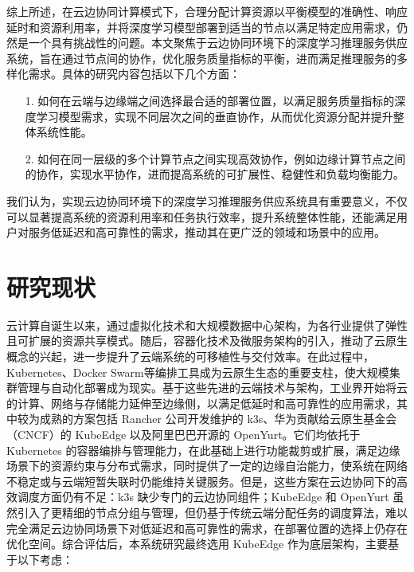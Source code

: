 综上所述，在云边协同计算模式下，合理分配计算资源以平衡模型的准确性、响应延时和资源利用率，并将深度学习模型部署到适当的节点以满足特定应用需求，仍然是一个具有挑战性的问题。本文聚焦于云边协同环境下的深度学习推理服务供应系统，旨在通过节点间的协作，优化服务质量指标的平衡，进而满足推理服务的多样化需求。具体的研究内容包括以下几个方面：

\begin{enumerate}
\item[1.] 如何在云端与边缘端之间选择最合适的部署位置，以满足服务质量指标的深度学习模型需求，实现不同层次之间的垂直协作，从而优化资源分配并提升整体系统性能。
\item[2.] 如何在同一层级的多个计算节点之间实现高效协作，例如边缘计算节点之间的协作，实现水平协作，进而提高系统的可扩展性、稳健性和负载均衡能力。
\end{enumerate}

我们认为，实现云边协同环境下的深度学习推理服务供应系统具有重要意义，不仅可以显著提高系统的资源利用率和任务执行效率，提升系统整体性能，还能满足用户对服务低延迟和高可靠性的需求，推动其在更广泛的领域和场景中的应用。

\section{研究现状}

云计算自诞生以来，通过虚拟化技术和大规模数据中心架构，为各行业提供了弹性且可扩展的资源共享模式。随后，容器化技术及微服务架构的引入，推动了云原生概念的兴起，进一步提升了云端系统的可移植性与交付效率\cite{deng2024cloud}。在此过程中，Kubernetes\cite{kubernetes}、Docker Swarm\cite{dockerswarm}等编排工具成为云原生生态的重要支柱，使大规模集群管理与自动化部署成为现实。基于这些先进的云端技术与架构，工业界开始将云的计算、网络与存储能力延伸至边缘侧，以满足低延时和高可靠性的应用需求，其中较为成熟的方案包括 Rancher 公司开发维护的 k3s\cite{fogli2021performance}、华为贡献给云原生基金会（CNCF）的 KubeEdge\cite{xiong2018extend} 以及阿里巴巴开源的 OpenYurt\cite{openyurt2023}。它们均依托于 Kubernetes 的容器编排与管理能力，在此基础上进行功能裁剪或扩展，满足边缘场景下的资源约束与分布式需求，同时提供了一定的边缘自治能力，使系统在网络不稳定或与云端短暂失联时仍能维持关键服务。但是，这些方案在云边协同下的高效调度方面仍有不足：k3s 缺少专门的云边协同组件；KubeEdge 和 OpenYurt 虽然引入了更精细的节点分组与管理，但仍基于传统云端分配任务的调度算法，难以完全满足云边协同场景下对低延迟和高可靠性的需求，在部署位置的选择上仍存在优化空间。综合评估后，本系统研究最终选用 KubeEdge 作为底层架构，主要基于以下考虑：

